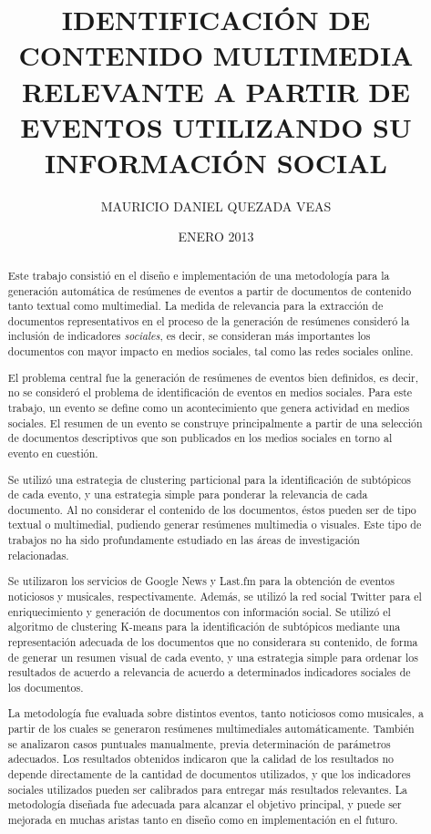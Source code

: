 \documentclass[upright, contnum]{umemoria}
\author{MAURICIO DANIEL QUEZADA VEAS}
\title{IDENTIFICACI\'ON DE CONTENIDO MULTIMEDIA RELEVANTE A PARTIR DE EVENTOS UTILIZANDO SU INFORMACI\'ON SOCIAL}
\date{ENERO 2013}
\begin{document}
\frontmatter
\maketitle

\begin{abstract}

Este trabajo consistió en el diseño e implementación de una metodología para la generación automática
de resúmenes de eventos a partir de documentos de contenido tanto textual como multimedial. La medida de relevancia para
la extracción de documentos representativos en el proceso de la generación de resúmenes consideró la inclusión de indicadores
\textit{sociales}, es decir, se consideran más importantes los documentos con mayor impacto en medios sociales, tal como
las redes sociales online.

El problema central fue la generación de resúmenes de eventos bien definidos, es decir, no se consideró el problema
de identificación de eventos en medios sociales. Para este trabajo, un evento se define como un acontecimiento que genera actividad en medios sociales. El resumen de un evento se construye principalmente a partir de una selección de documentos descriptivos que son publicados en los medios sociales en torno al evento en cuestión.

Se utilizó una estrategia de clustering particional para la identificación
de subtópicos de cada evento, y una estrategia simple para ponderar la relevancia de cada documento. Al no considerar
el contenido de los documentos, éstos pueden ser de tipo textual o multimedial, pudiendo generar resúmenes multimedia o visuales.
Este tipo de trabajos no ha sido profundamente estudiado en las áreas de investigación relacionadas.

Se utilizaron los servicios de Google News y Last.fm para la obtención de eventos noticiosos y musicales, respectivamente.
Además, se utilizó la red social Twitter para el enriquecimiento y generación de documentos con información social. Se utilizó el
algoritmo de clustering K-means para la identificación de subtópicos mediante una representación adecuada de los documentos que
no considerara su contenido, de forma de generar un resumen visual de cada evento, y una estrategia simple para ordenar los resultados de acuerdo a relevancia de acuerdo a determinados indicadores sociales de los documentos.

La metodología fue evaluada sobre distintos eventos, tanto noticiosos como musicales, a partir de los cuales se generaron resúmenes multimediales automáticamente. También se analizaron casos puntuales manualmente, previa determinación de parámetros adecuados. Los resultados obtenidos indicaron que la calidad de los resultados no depende directamente de la cantidad de documentos utilizados, y que los indicadores sociales utilizados pueden ser calibrados para entregar más resultados relevantes. La metodología diseñada fue adecuada para alcanzar el objetivo principal, y puede ser mejorada en muchas aristas tanto en diseño como en implementación en el futuro.

\end{abstract}
\end{document}
